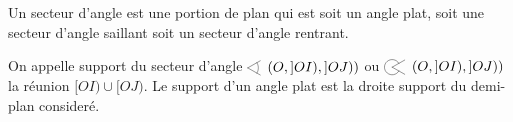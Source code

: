 \begin{defi}    
    Un secteur d'angle est une portion de plan qui est soit un angle plat, soit une secteur d'angle saillant soit un secteur d'angle rentrant. 
\end{defi}

\begin{defi}
    On appelle support du secteur d'angle $\anglesaillant\left({O},{]OI)},{]OJ)}\right)$ ou $\anglerentrant \left({O},{]OI)},{]OJ)}\right)$ la réunion $[OI)\cup[OJ)$. Le support d'un angle plat est la droite support du demi-plan consideré.
\end{defi}

